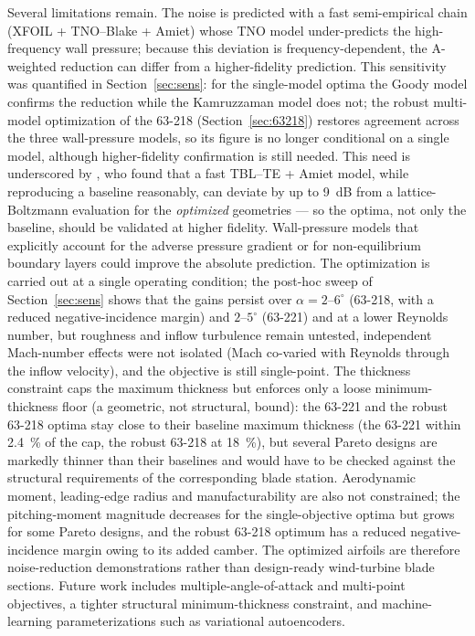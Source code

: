 \documentclass[preprint,3p,times]{elsarticle}
\begin{document}
Several limitations remain. The noise is predicted with a fast semi-empirical
chain (XFOIL + TNO--Blake + Amiet) whose TNO model under-predicts the
high-frequency wall pressure; because this deviation is frequency-dependent, the
A-weighted reduction can differ from a higher-fidelity prediction. This
sensitivity was quantified in Section~\ref{sec:sens}: for the single-model
optima the Goody model confirms the reduction while the Kamruzzaman model does
not; the robust multi-model optimization of the 63-218
(Section~\ref{sec:63218}) restores agreement across the three
wall-pressure models, so its figure is no longer conditional on a single
model, although higher-fidelity confirmation is still needed. This need is
underscored by \citet{Barry2026}, who found that a fast TBL--TE + Amiet model,
while reproducing a baseline reasonably, can deviate by up to \SI{9}{dB} from a
lattice-Boltzmann evaluation for the \emph{optimized} geometries --- so the
optima, not only the baseline, should be validated at higher fidelity.
Wall-pressure models that
explicitly account for the adverse pressure
gradient \citep{Rozenberg2012,LeeShum2019} or for non-equilibrium boundary
layers \citep{Pargal2024} could improve the absolute prediction. The
optimization is carried out at a single operating condition; the post-hoc
sweep of Section~\ref{sec:sens} shows that the gains persist over
$\alpha=2$--$6^{\circ}$ (63-218, with a reduced negative-incidence margin) and
$2$--$5^{\circ}$ (63-221) and at a lower
Reynolds number, but roughness and inflow turbulence remain untested,
independent Mach-number effects were not isolated (Mach co-varied with
Reynolds through the inflow velocity), and the objective is still
single-point. The thickness constraint caps the maximum thickness but
enforces only a loose minimum-thickness floor (a geometric, not structural,
bound): the 63-221 and the robust 63-218 optima stay close to their
baseline maximum thickness (the 63-221 within \SI{2.4}{\percent} of the cap,
the robust 63-218 at \SI{18}{\percent}), but several Pareto designs are markedly
thinner than their baselines and would have to be checked against the structural
requirements of the corresponding blade station. Aerodynamic moment, leading-edge radius and
manufacturability are also
not constrained; the pitching-moment magnitude decreases for the
single-objective optima but grows for some Pareto designs, and the robust
63-218 optimum has a reduced negative-incidence margin owing to its added
camber. The optimized
airfoils are therefore
noise-reduction demonstrations rather than design-ready wind-turbine blade
sections. Future work includes
multiple-angle-of-attack and multi-point objectives, a tighter
structural minimum-thickness constraint, and machine-learning parameterizations
such as variational autoencoders.
\end{document}
